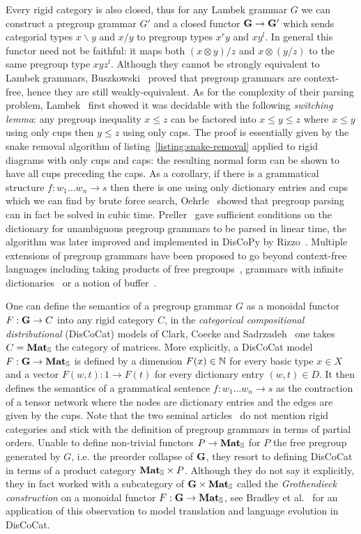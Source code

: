 Every rigid category is also closed, thus for any Lambek grammar $G$ we can construct a pregroup grammar $G'$ and a closed functor $\G \to \G'$ which sends categorial types $x \backslash y$ and $x / y$ to pregroup types $x^r y$ and $x y^l$.
In general this functor need not be faithful: it maps both $(x \otimes y) / z$ and $x \otimes (y / z)$ to the same pregroup type $x y z^l$.
Although they cannot be strongly equivalent to Lambek grammars, Buszkowski~\cite{Buszkowski01} proved that pregroup grammars are context-free, hence they are still weakly-equivalent.
As for the complexity of their parsing problem, Lambek~\cite{Lambek99} first showed it was decidable with the following \emph{switching lemma}: any pregroup inequality $x \leq z$ can be factored into $x \leq y \leq z$ where $x \leq y$ using only cups then $y \leq z$ using only caps.
The proof is essentially given by the snake removal algorithm of listing~\ref{listing:snake-removal} applied to rigid diagrams with only cups and caps: the resulting normal form can be shown to have all cups preceding the caps.
As a corollary, if there is a grammatical structure $f : w_1 \dots w_n \to s$ then there is one using only dictionary entries and cups which we can find by brute force search, Oehrle~\cite{Oehrle04} showed that pregroup parsing can in fact be solved in cubic time.
Preller~\cite{Preller07a} gave sufficient conditions on the dictionary for unambiguous pregroup grammars to be parsed in linear time, the algorithm was later improved and implemented in DisCoPy by Rizzo~\cite{Rizzo21}.
Multiple extensions of pregroup grammars have been proposed to go beyond context-free languages including taking products of free pregroups~\cite[Section~28]{Lambek08}, grammars with infinite dictionaries~\cite{Preller10} or a notion of buffer~\cite{GenkinEtAl10}.

One can define the semantics of a pregroup grammar $G$ as a monoidal functor $F : \G \to C$ into any rigid category $C$, in the \emph{categorical compositional distributional} (DisCoCat) models of Clark, Coecke and Sadrzadeh~\cite{ClarkEtAl08,ClarkEtAl10} one takes $C = \mathbf{Mat}_\S$ the category of matrices.
More explicitly, a DisCoCat model $F : \G \to \mathbf{Mat}_\S$ is defined by a dimension $F(x) \in \N$ for every basic type $x \in X$ and a vector $F(w, t) : 1 \to F(t)$ for every dictionary entry $(w, t) \in D$.
It then defines the semantics of a grammatical sentence $f : w_1 \dots w_n \to s$ as the contraction of a tensor network where the nodes are dictionary entries and the edges are given by the cups.
Note that the two seminal articles~\cite{ClarkEtAl08,ClarkEtAl10} do not mention rigid categories and stick with the definition of pregroup grammars in terms of partial orders.
Unable to define non-trivial functors $P \to \mathbf{Mat}_\S$ for $P$ the free pregroup generated by $G$, i.e. the preorder collapse of $\G$, they resort to defining DisCoCat in terms of a product category $\mathbf{Mat}_\S \times P$.
Although they do not say it explicitly, they in fact worked with a subcategory of $\G \times \mathbf{Mat}_\S$ called the \emph{Grothendieck construction} on a monoidal functor $F : \G \to \mathbf{Mat}_\S$, see Bradley et al.~\cite{BradleyEtAl18} for an application of this observation to model translation and language evolution in DisCoCat.

